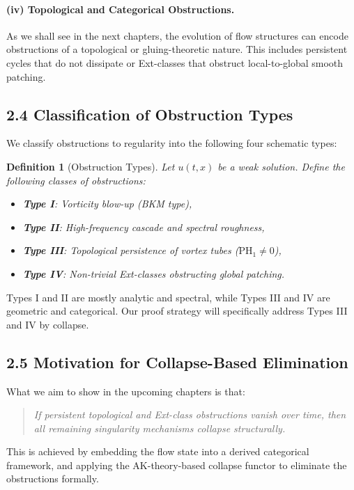 \documentclass[11pt]{article}
\newtheorem{definition}[theorem]{Definition}
\begin{document}
\paragraph{(iv) Topological and Categorical Obstructions.} As we shall see in the next chapters, the evolution of flow structures can encode obstructions of a topological or gluing-theoretic nature. This includes persistent cycles that do not dissipate or Ext-classes that obstruct local-to-global smooth patching.

\subsection{2.4 Classification of Obstruction Types}

We classify obstructions to regularity into the following four schematic types:

\begin{definition}[Obstruction Types]
Let \( u(t,x) \) be a weak solution. Define the following classes of obstructions:

\begin{itemize}
  \item \textbf{Type I}: Vorticity blow-up (BKM type),
  \item \textbf{Type II}: High-frequency cascade and spectral roughness,
  \item \textbf{Type III}: Topological persistence of vortex tubes (\( \mathrm{PH}_1 \neq 0 \)),
  \item \textbf{Type IV}: Non-trivial Ext-classes obstructing global patching.
\end{itemize}
\end{definition}

Types I and II are mostly analytic and spectral, while Types III and IV are geometric and categorical. Our proof strategy will specifically address Types III and IV by collapse.

\subsection{2.5 Motivation for Collapse-Based Elimination}

What we aim to show in the upcoming chapters is that:
\begin{quote}
\textit{If persistent topological and Ext-class obstructions vanish over time, then all remaining singularity mechanisms collapse structurally.}
\end{quote}

This is achieved by embedding the flow state into a derived categorical framework, and applying the AK-theory-based collapse functor to eliminate the obstructions formally.
\end{document}
